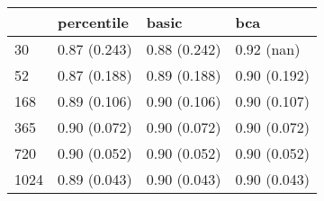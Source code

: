 \begin{tabular}{llll}
\toprule
 & percentile & basic & bca \\
\midrule
30 & 0.87 (0.243) & 0.88 (0.242) & 0.92 (nan) \\
52 & 0.87 (0.188) & 0.89 (0.188) & 0.90 (0.192) \\
168 & 0.89 (0.106) & 0.90 (0.106) & 0.90 (0.107) \\
365 & 0.90 (0.072) & 0.90 (0.072) & 0.90 (0.072) \\
720 & 0.90 (0.052) & 0.90 (0.052) & 0.90 (0.052) \\
1024 & 0.89 (0.043) & 0.90 (0.043) & 0.90 (0.043) \\
\bottomrule
\end{tabular}
